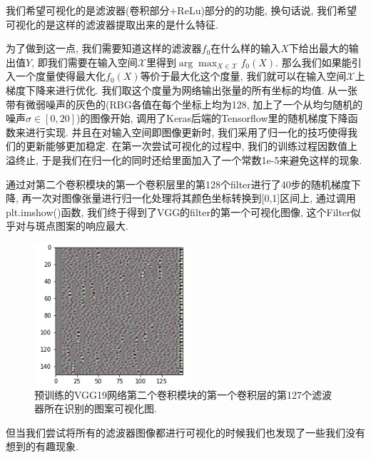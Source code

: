 \documentclass[lang=cn,11pt]{elegantpaper}
\begin{document}
我们希望可视化的是滤波器(卷积部分$+$ReLu)部分的的功能, 换句话说, 我们希望可视化的是这样的滤波器提取出来的是什么特征. 

为了做到这一点, 我们需要知道这样的滤波器$f_0$在什么样的输入$X$下给出最大的输出值$Y$, 即我们需要在输入空间$\mathcal X$里得到$\arg \max_{X\in \mathcal X} f_0(X)$. 那么我们如果能引入一个度量使得最大化$f_0(X)$等价于最大化这个度量, 我们就可以在输入空间$\mathcal X$上梯度下降来进行优化. 我们取这个度量为网络输出张量的所有坐标的均值. 从一张带有微弱噪声的灰色的(RBG各值在每个坐标上均为128, 加上了一个从均匀随机的噪声$\sigma\in[0,20]$)的图像开始, 调用了Keras后端的Tensorflow里的随机梯度下降函数来进行实现. 并且在对输入空间即图像更新时, 我们采用了归一化的技巧使得我们的更新能够更加稳定. 在第一次尝试可视化的过程中, 我们的训练过程因数值上溢终止, 于是我们在归一化的同时还给里面加入了一个常数1e-5来避免这样的现象. 

通过对第二个卷积模块的第一个卷积层里的第128个filter进行了40步的随机梯度下降, 再一次对图像张量进行归一化处理将其颜色坐标转换到[0,1]区间上, 通过调用plt.imshow()函数, 我们终于得到了VGG的filter的第一个可视化图像, 这个Filter似乎对与斑点图案的响应最大. 
\begin{figure}[htbp]
	\centering
  \hspace{-30pt}\includegraphics[width=0.5\textwidth]{block2_conv1_127.png}
  \tiny
  \caption{预训练的VGG19网络第二个卷积模块的第一个卷积层的第127个滤波器所在识别的图案可视化图.\label{fig:pretrain-singal}}
\end{figure}

\normalsize
但当我们尝试将所有的滤波器图像都进行可视化的时候我们也发现了一些我们没有想到的有趣现象.
\end{document}
